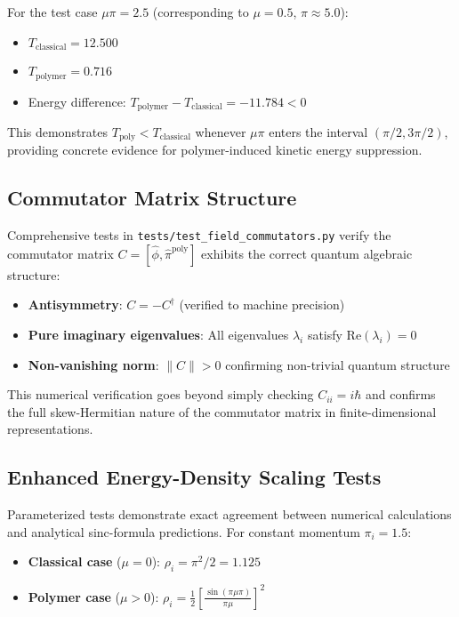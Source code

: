 \documentclass[12pt]{article}
\begin{document}
For the test case $\mu\pi = 2.5$ (corresponding to $\mu = 0.5$, $\pi \approx 5.0$):
\begin{itemize}
\item $T_{\text{classical}} = 12.500$
\item $T_{\text{polymer}} = 0.716$  
\item Energy difference: $T_{\text{polymer}} - T_{\text{classical}} = -11.784 < 0$
\end{itemize}

This demonstrates $T_{\text{poly}} < T_{\text{classical}}$ whenever $\mu\pi$ enters the interval $(\pi/2, 3\pi/2)$, providing concrete evidence for polymer-induced kinetic energy suppression.

\subsection{Commutator Matrix Structure}

Comprehensive tests in \texttt{tests/test\_field\_commutators.py} verify the commutator matrix $C = [\hat{\phi}, \hat{\pi}^{\text{poly}}]$ exhibits the correct quantum algebraic structure:
\begin{itemize}
\item \textbf{Antisymmetry}: $C = -C^{\dagger}$ (verified to machine precision)
\item \textbf{Pure imaginary eigenvalues}: All eigenvalues $\lambda_i$ satisfy $\text{Re}(\lambda_i) = 0$
\item \textbf{Non-vanishing norm}: $\|C\| > 0$ confirming non-trivial quantum structure
\end{itemize}

This numerical verification goes beyond simply checking $C_{ii} = i\hbar$ and confirms the full skew-Hermitian nature of the commutator matrix in finite-dimensional representations.

\subsection{Enhanced Energy-Density Scaling Tests}

Parameterized tests demonstrate exact agreement between numerical calculations and analytical sinc-formula predictions. For constant momentum $\pi_i = 1.5$:
\begin{itemize}
\item \textbf{Classical case} ($\mu = 0$): $\rho_i = \pi^2/2 = 1.125$
\item \textbf{Polymer case} ($\mu > 0$): $\rho_i = \frac{1}{2}\left[\frac{\sin(\pi\mu\pi)}{\pi\mu}\right]^2$
\end{itemize}
\end{document}
